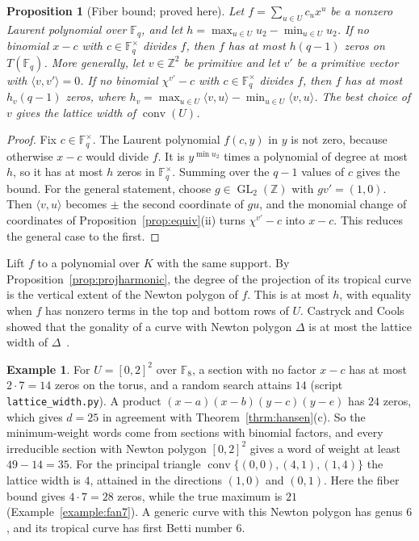 \documentclass[12pt,letterpaper]{article}
\numberwithin{equation}{section}
\newtheorem{proposition}[theorem]{Proposition}
\theoremstyle{definition}
\newtheorem{example}[theorem]{Example}
\theoremstyle{remark}
\DeclareMathOperator{\conv}{conv}
\DeclareMathOperator{\GL}{GL}
\newcommand{\F}{\mathbb{F}}
\newcommand{\Z}{\mathbb{Z}}
\newcommand{\Fq}{\mathbb{F}_q}
\newcommand{\Fqs}{\mathbb{F}_q^{\times}}
\begin{document}
\begin{proposition}[Fiber bound; proved here]\label{prop:fiber}
Let $f=\sum_{u\in U}c_ux^u$ be a nonzero Laurent polynomial over $\Fq$, and let
$h=\max_{u\in U}u_2-\min_{u\in U}u_2$. If no binomial $x-c$ with $c\in\Fqs$
divides $f$, then $f$ has at most $h(q-1)$ zeros on $T(\Fq)$. More generally,
let $v\in\Z^2$ be primitive and let $v'$ be a primitive vector with $\langle
v,v'\rangle=0$. If no binomial $\chi^{v'}-c$ with $c\in\Fqs$ divides $f$, then
$f$ has at most $h_v(q-1)$ zeros, where
$h_v=\max_{u\in U}\langle v,u\rangle-\min_{u\in U}\langle v,u\rangle$. The best
choice of $v$ gives the lattice width of $\conv(U)$.
\end{proposition}

\begin{proof}
Fix $c\in\Fqs$. The Laurent polynomial $f(c,y)$ in $y$ is not zero, because
otherwise $x-c$ would divide $f$. It is $y^{\min u_2}$ times a polynomial of
degree at most $h$, so it has at most $h$ zeros in $\Fqs$. Summing over the
$q-1$ values of $c$ gives the bound. For the general statement, choose
$g\in\GL_2(\Z)$ with $gv'=(1,0)$. Then $\langle v,u\rangle$ becomes $\pm$ the
second coordinate of $gu$, and the monomial change of
coordinates of Proposition~\ref{prop:equiv}(ii) turns $\chi^{v'}-c$ into $x-c$.
This reduces the general case to the first.
\end{proof}

Lift $f$ to a polynomial over $K$ with the same support. By
Proposition~\ref{prop:projharmonic}, the degree of the projection of its
tropical curve is the vertical extent of the Newton polygon of $f$. This is at
most $h$, with equality when $f$ has nonzero terms in the top and bottom rows
of $U$.
Castryck and Cools showed that the gonality of a curve with Newton polygon
$\Delta$ is at most the lattice width of $\Delta$~\cite{CC12}.

\begin{example}\label{ex:fiberbound}
For $U=[0,2]^2$ over $\F_8$, a section with no factor $x-c$ has at most
$2\cdot7=14$ zeros on the torus, and a random search attains $14$ (script
\texttt{lattice\_width.py}). A product $(x-a)(x-b)(y-c)(y-e)$ has $24$ zeros,
which gives $d=25$ in agreement with Theorem~\ref{thrm:hansen}(c). So the
minimum-weight words come from sections with binomial factors, and every
irreducible section with Newton polygon $[0,2]^2$ gives a word of weight at
least $49-14=35$. For the principal triangle $\conv\{(0,0),(4,1),(1,4)\}$ the
lattice width is $4$, attained in the directions $(1,0)$ and $(0,1)$. Here the
fiber bound gives $4\cdot7=28$ zeros, while the true maximum is $21$
(Example~\ref{example:fan7}). A generic curve with this Newton polygon has
genus $6$, and its tropical curve has first Betti number $6$.
\end{example}
\end{document}
